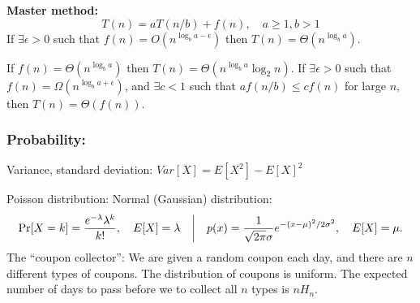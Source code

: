 \documentclass[12pt]{extarticle}
\begin{document}
\begin{multicols*}{2}
			\par\vskip 3pt
			\textbf{Master method:}
				$$T(n) = aT(n/b) + f(n), \quad a\geq 1, b > 1$$
			If $\exists \epsilon > 0$ such that $f(n) = O(n^{\log_b a - \epsilon})$ then $T(n) = \Theta(n^{\log_b a}).$
			\par
			If $f(n) = \Theta(n^{\log_b a})$ then
			$T(n) = \Theta(n^{\log_b a} \log_2 n).$
			\newline If $\exists \epsilon > 0$ such that $f(n) = \Omega(n^{\log_b a + \epsilon})$,
			and $\exists c < 1$ such that $a f(n/b) \leq cf(n)$ for large $n$,
			then $T(n) = \Theta(f(n)).$
			\par\vskip 3pt
			\subsubsection*{Probability:}
			Variance, standard deviation:
			$Var[X] = E[X^2] - E[X]^2$
			\par\vskip 2pt
			\hspace{1cm} Poisson distribution: \hspace{2cm} Normal (Gaussian) distribution:
			$$
			\Pr[X = k] = {e^{-\lambda} \lambda^k \over k!}, \quad  E[X] = \lambda \quad \bigg| \quad p(x) = {1 \over \sqrt{2 \pi} \sigma} e^{-(x-\mu)^2/2\sigma^2}, \quad E[X] = \mu.
			$$
			The ``coupon collector'':
			We are given a random coupon each day,
			and there are $n$ different types of coupons.
			The distribution of coupons is uniform.
			The expected number of days to pass before we to collect all $n$ types is $n H_n.$
			\par\vskip 2pt

\end{multicols*}
\end{document}
